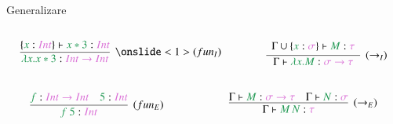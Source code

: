 \documentclass[xcolor=pdftex,romanian,colorlinks]{beamer}
\begin{document}
\begin{frame}{Generalizare}

\begin{columns}
\begin{column}{0.4\textwidth}
\vspace{-.4cm}
\[
\infer[\onslide<1>{(fun_I)}]
	{{\color{True}\lambda x.x * 3} : \sel{Int \to Int}}
	{
	\{{\color{True}x} : \sel{Int}\} \vdash {\color{True}x * 3} : \sel{Int} 
	}
 \vspace{.35cm}
\]
\end{column}
\begin{column}{0.4\textwidth}
\[
\infer[(\to_{I})]
	{\Gamma \vdash{\color{True}\lambda x.M} : \sel{\sigma \to \tau}}
	{
	\begin{array}{c}
	\Gamma \cup \{{\color{True}x} : \sel{\sigma}\} \vdash {\color{True}M} : \sel{\tau} \\
	\end{array}
	}
\]
\end{column}
\end{columns}

 \vspace{.6cm}

\begin{columns}
\begin{column}{0.4\textwidth}
\vspace{-.4cm}
\[
\infer[(fun_E)]
	{{\color{True}f\ 5} : \sel{Int}}
	{{\color{True}f} : \sel{Int \to Int} \quad {\color{True}5} : \sel{Int}}
\]
\end{column}
\begin{column}{0.4\textwidth}
\[
\infer[(\to_E)]
	{\Gamma \vdash{\color{True}\app{M}{N}} : \sel{\tau}}
	{\Gamma \vdash{\color{True}M} : \sel{\sigma \to \tau} \quad \Gamma \vdash{\color{True}N} : \sel{\sigma}}
\]
\end{column}
\end{columns}

\end{frame}
\end{document}
